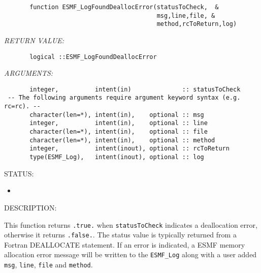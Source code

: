  
\begin{verbatim}       function ESMF_LogFoundDeallocError(statusToCheck,  &
                                          msg,line,file, &
                                          method,rcToReturn,log)\end{verbatim}{\em RETURN VALUE:}
\begin{verbatim}       logical ::ESMF_LogFoundDeallocError\end{verbatim}{\em ARGUMENTS:}
\begin{verbatim}       integer,          intent(in)              :: statusToCheck
 -- The following arguments require argument keyword syntax (e.g. rc=rc). --
       character(len=*), intent(in),    optional :: msg
       integer,          intent(in),    optional :: line
       character(len=*), intent(in),    optional :: file
       character(len=*), intent(in),    optional :: method
       integer,          intent(inout), optional :: rcToReturn
       type(ESMF_Log),   intent(inout), optional :: log
 \end{verbatim}
{\sf STATUS:}
   \begin{itemize}
   \item{}
   \end{itemize}
  
{\sf DESCRIPTION:\\ }


        This function returns {\tt .true.} when {\tt statusToCheck} indicates
        a deallocation error, otherwise it returns {\tt .false.}.  The status
        value is typically returned from a Fortran DEALLOCATE statement.
        If an error is indicated, a ESMF memory allocation error message
        will be written to the {\tt ESMF\_Log} along with a user added {\tt msg},
        {\tt line}, {\tt file} and {\tt method}.
  
